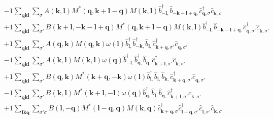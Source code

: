 \begin{align*}
	&-1 \sum_{ \mathbf{q} \mathbf{k} \mathbf{l} } \sum_{ \sigma } A( \mathbf{k}, \mathbf{l} )  M^*( \mathbf{q}, \mathbf{k}+\mathbf{l}-\mathbf{q} )  M( \mathbf{k}, \mathbf{l} )   \hat{b}_{ -\mathbf{l}, }^\dagger  \hat{b}_{ -\mathbf{k}-\mathbf{l}+\mathbf{q}, }^{\phantom{\dagger}} \hat{c}_{ \mathbf{q}, \sigma }^\dagger  \hat{c}_{ \mathbf{k}, \sigma }^{\phantom{\dagger}}  \\
	&+1 \sum_{ \mathbf{q} \mathbf{k} \mathbf{l} } \sum_{ \sigma' } B( \mathbf{k}+\mathbf{l}, -\mathbf{k}-\mathbf{l}+\mathbf{q} )  M^*( \mathbf{q}, \mathbf{k}+\mathbf{l}-\mathbf{q} )  M( \mathbf{k}, \mathbf{l} )   \hat{b}_{ -\mathbf{l}, }^\dagger  \hat{b}_{ -\mathbf{k}-\mathbf{l}+\mathbf{q}, }^{\phantom{\dagger}} \hat{c}_{ \mathbf{q}, \sigma' }^\dagger  \hat{c}_{ \mathbf{k}, \sigma' }^{\phantom{\dagger}}  \\
	&+1 \sum_{ \mathbf{q} \mathbf{k} \mathbf{l} } \sum_{ \sigma' } A( \mathbf{q}, \mathbf{k} )  M( \mathbf{q}, \mathbf{k} )  \omega( \mathbf{l} )   \hat{b}_{ \mathbf{l}, }^\dagger  \hat{b}_{ -\mathbf{k}, }^\dagger  \hat{b}_{ \mathbf{l}, }^{\phantom{\dagger}} \hat{c}_{ \mathbf{k}+\mathbf{q}, \sigma' }^\dagger  \hat{c}_{ \mathbf{q}, \sigma' }^{\phantom{\dagger}}  \\
	&-1 \sum_{ \mathbf{q} \mathbf{k} \mathbf{l} } \sum_{ \sigma' } A( \mathbf{k}, \mathbf{l} )  M( \mathbf{k}, \mathbf{l} )  \omega( \mathbf{q} )   \hat{b}_{ -\mathbf{l}, }^\dagger  \hat{b}_{ \mathbf{q}, }^\dagger  \hat{b}_{ \mathbf{q}, }^{\phantom{\dagger}} \hat{c}_{ \mathbf{k}+\mathbf{l}, \sigma' }^\dagger  \hat{c}_{ \mathbf{k}, \sigma' }^{\phantom{\dagger}}  \\
	&+1 \sum_{ \mathbf{q} \mathbf{k} \mathbf{l} } \sum_{ \sigma' } B( \mathbf{q}, \mathbf{k} )  M^*( \mathbf{k}+\mathbf{q}, -\mathbf{k} )  \omega( \mathbf{l} )   \hat{b}_{ \mathbf{l}, }^\dagger  \hat{b}_{ \mathbf{l}, }^{\phantom{\dagger}} \hat{b}_{ \mathbf{k}, }^{\phantom{\dagger}} \hat{c}_{ \mathbf{k}+\mathbf{q}, \sigma' }^\dagger  \hat{c}_{ \mathbf{q}, \sigma' }^{\phantom{\dagger}}  \\
	&-1 \sum_{ \mathbf{q} \mathbf{k} \mathbf{l} } \sum_{ \sigma' } B( \mathbf{k}, \mathbf{l} )  M^*( \mathbf{k}+\mathbf{l}, -\mathbf{l} )  \omega( \mathbf{q} )   \hat{b}_{ \mathbf{q}, }^\dagger  \hat{b}_{ \mathbf{l}, }^{\phantom{\dagger}} \hat{b}_{ \mathbf{q}, }^{\phantom{\dagger}} \hat{c}_{ \mathbf{k}+\mathbf{l}, \sigma' }^\dagger  \hat{c}_{ \mathbf{k}, \sigma' }^{\phantom{\dagger}}  \\
	&+1 \sum_{ \mathbf{l} \mathbf{k} \mathbf{q} } \sum_{ \sigma' \sigma } B( \mathbf{l}, -\mathbf{q} )  M^*( \mathbf{l}-\mathbf{q}, \mathbf{q} )  M( \mathbf{k}, \mathbf{q} )   \hat{c}_{ \mathbf{k}+\mathbf{q}, \sigma }^\dagger  \hat{c}_{ \mathbf{l}-\mathbf{q}, \sigma' }^\dagger  \hat{c}_{ \mathbf{l}, \sigma' }^{\phantom{\dagger}} \hat{c}_{ \mathbf{k}, \sigma }^{\phantom{\dagger}}  \\

\end{align*}
